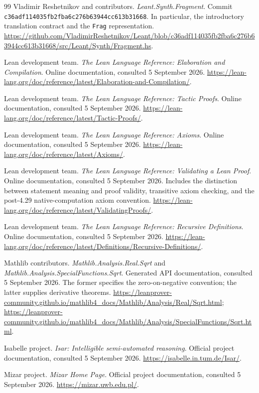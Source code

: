 \documentclass[11pt,a4paper]{article}
\theoremstyle{remark}
\newcommand{\ty}[1]{\texttt{#1}}
\newcommand{\lv}{c36adf114035fb2fba6c276b63944cc613b31668}
\begin{document}
\begin{thebibliography}{99}
Vladimir Reshetnikov and contributors. \emph{Leant.Synth.Fragment}. Commit \texttt{\lv}. In particular, the introductory translation contract and the \ty{Frag} representation.
\url{https://github.com/VladimirReshetnikov/Leant/blob/c36adf114035fb2fba6c276b63944cc613b31668/src/Leant/Synth/Fragment.hs}.

Lean development team. \emph{The Lean Language Reference: Elaboration and Compilation}. Online documentation, consulted 5 September 2026.
\url{https://lean-lang.org/doc/reference/latest/Elaboration-and-Compilation/}.

Lean development team. \emph{The Lean Language Reference: Tactic Proofs}. Online documentation, consulted 5 September 2026.
\url{https://lean-lang.org/doc/reference/latest/Tactic-Proofs/}.

Lean development team. \emph{The Lean Language Reference: Axioms}. Online documentation, consulted 5 September 2026.
\url{https://lean-lang.org/doc/reference/latest/Axioms/}.

Lean development team. \emph{The Lean Language Reference: Validating a Lean Proof}. Online documentation, consulted 5 September 2026. Includes the distinction between statement meaning and proof validity, transitive axiom checking, and the post-4.29 native-computation axiom convention.
\url{https://lean-lang.org/doc/reference/latest/ValidatingProofs/}.

Lean development team. \emph{The Lean Language Reference: Recursive Definitions}. Online documentation, consulted 5 September 2026.
\url{https://lean-lang.org/doc/reference/latest/Definitions/Recursive-Definitions/}.

Mathlib contributors. \emph{Mathlib.Analysis.Real.Sqrt} and \emph{Mathlib.Analysis.SpecialFunctions.Sqrt}. Generated API documentation, consulted 5 September 2026. The former specifies the zero-on-negative convention; the latter supplies derivative theorems.
\url{https://leanprover-community.github.io/mathlib4_docs/Mathlib/Analysis/Real/Sqrt.html};
\url{https://leanprover-community.github.io/mathlib4_docs/Mathlib/Analysis/SpecialFunctions/Sqrt.html}.

Isabelle project. \emph{Isar: Intelligible semi-automated reasoning}. Official project documentation, consulted 5 September 2026.
\url{https://isabelle.in.tum.de/Isar/}.

Mizar project. \emph{Mizar Home Page}. Official project documentation, consulted 5 September 2026.
\url{https://mizar.uwb.edu.pl/}.


\end{thebibliography}
\end{document}
